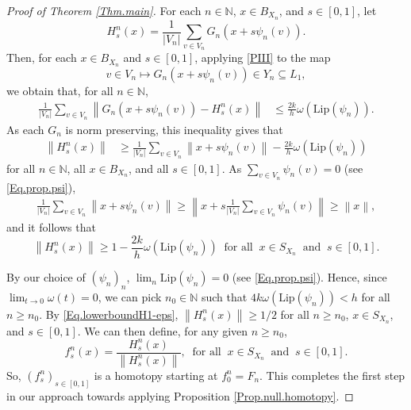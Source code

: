 \documentclass[11pt]{amsart}
\newcommand{\N}{\mathbb{N}}
\newcommand{\Lip}{\mathrm{Lip}}
\theoremstyle{definition}
\theoremstyle{remark}
\newcommand{\norm}[1]{\left\lVert #1 \right\rVert}
\begin{document}
\begin{proof}[Proof of Theorem \ref{Thm.main}]
 
  For each  $n\in\N$,   $ 
  x\in B_{X_n}$, and  $s\in[0,1]$,  let 
\begin{equation*}
 H^n_s(x)=\frac{1}{|V_n|}\sum_{v\in V_n} G_n(x+s\psi_n(v)).
  \label{eq:average}
\end{equation*}
Then, for each  $x\in B_{X_n}$ and $s\in[0,1]$, applying \eqref{PIII} to the map   
\[
v\in V_n\mapsto G_n(x+s\psi_n(v))\in Y_n\subseteq  L_1 ,
\]
we obtain that, for all $n\in\N$,
\begin{equation*}
  \begin{aligned}
   \frac{1}{|V_n|} \sum_{v\in V_n} \norm{G_n(x+s\psi_n(v))-H^n_s(x)}
    &\leq \frac{2k}{h}\omega\left(\Lip(\psi_n)\right).
  \end{aligned}
  \label{eq:deviation}
\end{equation*}
As each $G_n$ is norm preserving, this inequality gives that
\begin{align}
   \norm{H^n_s(x)}&\geq \frac{1}{|V_n|}\sum_{v\in V_n}\norm{x+s\psi_n(v)}-\frac{2k}{h}\omega\left(\Lip(\psi_n)\right)
  \label{eq:key}
\end{align}
for all  $n\in\N$, all 
      $x\in B_{X_n}$, and all  $ s\in[0,1]$.
As $ \sum_{v\in V_n}\psi_n(v)=0$ (see \eqref{Eq.prop.psi}), 
\begin{align*}
  \frac{1}{|V_n|}\sum_{v\in V_n}\norm{x+s\psi_n(v)}\geq 
   \left\|x+s\frac{1}{|V_n|}\sum_{v\in V_n}\psi_n(v)\right\|  \geq\left\|x\right\|, 
\end{align*}
and it follows that 
  \begin{equation} \label{Eq.lowerboundH1-eps}          \norm{H^n_s(x)} \geq 1-\frac{2k}{h}\omega\left(\Lip(\psi_n)\right)\ \text{ for all }\ x\in S_{X_n}\ \text{ and }\ s\in [0,1].\end{equation}
      

By our choice of $(\psi_n)_n$,  $\lim_n\Lip(\psi_n)=0$ (see \eqref{Eq.prop.psi}). Hence, since  $\lim_{t\to 0}\omega(t)=0$, we can  pick $n_0\in\N$ such that   \linebreak$4k\omega (\Lip(\psi_n))<h$ for all $n\geq  n_0$. By \eqref{Eq.lowerboundH1-eps},   $\norm{H^n_s(x)} \geq 1/2$ for all $n\geq n_0$, $x\in S_{X_n}$, and $s\in [0,1]$. We can then define,  for any given $n\geq n_0$,
\begin{equation}
  f^n_s(x)=\frac{H^n_s(x)}{\norm{H^n_s(x)}}, \ \text{ for all }\ x\in S_{X_n} \ \text{ and }\ s\in  [0,1].
  \label{eq:homotopy}
\end{equation}
So, $(f^n_s)_{s\in [0,1]}$ is a homotopy starting at $f^n_0=F_n$. This completes the first step in our approach towards applying Proposition \ref{Prop.null.homotopy}. 


\end{proof}
\end{document}
